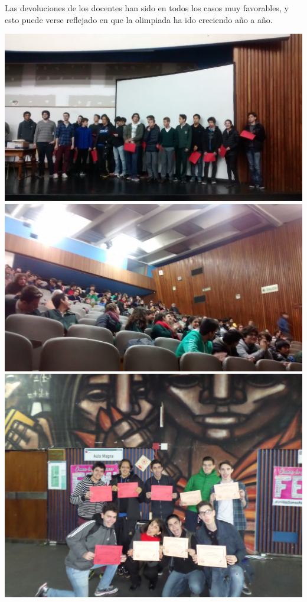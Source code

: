 \documentclass[a0paper,portrait,final,fontscale=0.302]{baposter}
\begin{document}
\begin{poster}
{\begin{minipage}[t]{0.63\textwidth}
    Las devoluciones de los docentes han sido en todos los casos muy
    favorables, y esto puede verse reflejado en que la olimpiada ha
    ido creciendo año a año.

    \includegraphics[width=0.33\columnwidth]{Fotos2016_1.jpg}\hfill
    \includegraphics[width=0.33\columnwidth]{Fotos2016_3.jpg}\hfill
    \includegraphics[width=0.33\columnwidth]{Fotos2016_7.jpg}
  \end{minipage}\hfill
  \begin{minipage}[t]{0.33\textwidth}
    \centering

\end{minipage}}
\end{poster}
\end{document}
